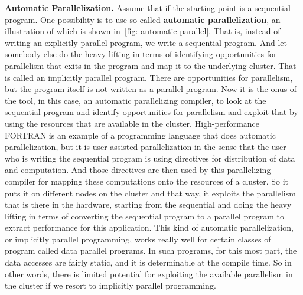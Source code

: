 \documentclass[11pt]{lecture}
\begin{document}
\noindent
{\bf Automatic Parallelization.} Assume that if the starting point is a sequential program. One possibility is to 
use so-called {\bf automatic parallelization}, an illustration of which is 
shown in~\autoref{fig: automatic-parallel}. 
That is, instead of writing an explicitly 
parallel program, we write a sequential program. And let somebody else do the heavy 
lifting in terms of identifying opportunities for parallelism that exits in the program 
and map it to the underlying cluster. That is called an implicitly parallel program. There 
are opportunities for parallelism, but the program itself is not written as a parallel 
program. Now it is the onus of the tool, in this case, an automatic parallelizing compiler, 
to look at the sequential program and identify opportunities for parallelism and exploit that by 
using the resources that are available in the cluster. High-performance FORTRAN is 
an example of a programming language that does automatic parallelization, but it is 
user-assisted parallelization in the sense that the user who is writing the sequential 
program is using directives for distribution of data and computation. And those directives are 
then used by this parallelizing compiler for mapping these computations onto the resources of 
a cluster. So it puts it on different nodes on the cluster and that way, it exploits the parallelism 
that is there in the hardware, starting from the sequential and doing the heavy lifting in terms 
of converting the sequential program to a parallel program to extract performance for this 
application. This kind of automatic parallelization, or implicitly parallel programming, works 
really well for certain classes of program called data parallel programs. In such programs, for this most 
part, the data accesses are fairly static, and it is determinable at the compile time. So in other words, there is limited potential for exploiting the available parallelism in the cluster if we resort to implicitly parallel 
programming. 
\end{document}
